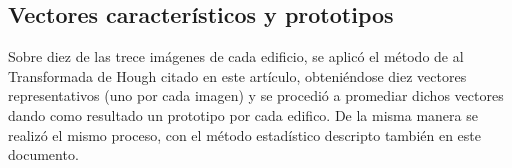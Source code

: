 \documentclass[conference,spanish,a4paper,10pt,oneside,final]{tfmpd}
\begin{document}
%
%
\subsection{Vectores característicos y prototipos}
Sobre diez de las trece imágenes de cada edificio, se aplicó el método de al Transformada de Hough citado en este artículo, obteniéndose diez vectores representativos (uno por cada imagen) y se procedió a promediar dichos vectores dando como resultado un prototipo por cada edifico. De la misma manera se realizó el mismo proceso, con el método estadístico descripto también en este documento.
\end{document}
